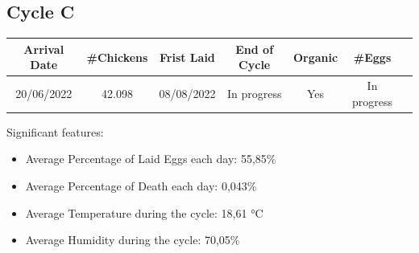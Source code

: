 \documentclass[11pt]{article}
\begin{document}
\subsection{Cycle C}
\begin{center}
    \begin{tabular}{| c | c | c | c | c | c | c |}
        \hline
        \textbf{Arrival Date} & \textbf{\#Chickens} & \textbf{Frist Laid} & \textbf{End of Cycle} & \textbf{Organic} & \textbf{\#Eggs}      \\ [0.5ex]
        \hline
        20/06/2022   & 42.098     & 08/08/2022 & In progress  & Yes     & In progress \\
        \hline
    \end{tabular}
\end{center}

Significant features:
\begin{itemize}
    \item Average Percentage of Laid Eggs each day: 55,85\%
    \item Average Percentage of Death each day: 0,043\%
    \item Average Temperature during the cycle: 18,61 °C
    \item Average Humidity during the cycle: 70,05\%
\end{itemize}
\end{document}
